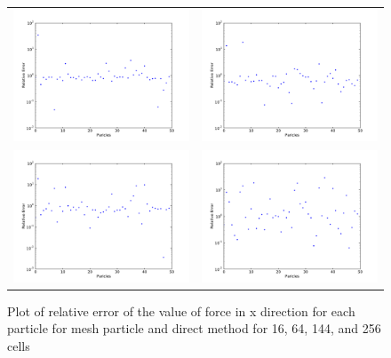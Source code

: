 \documentclass[10pt]{article}
\begin{document}
\begin{figure}[htp]
  \centering
  \caption{\label{fig:CompareForceErr}Plot of relative error of the value of force in x direction for each particle for mesh particle and direct method for 16, 64, 144, and 256 cells}
  \begin{tabular}{cc}
    \includegraphics[width=75mm]{Plots/MPCompare/Compare_4_error.pdf}&
    \includegraphics[width=75mm]{Plots/MPCompare/Compare_8_error.pdf}\\
    \includegraphics[width=75mm]{Plots/MPCompare/Compare_12_error.pdf}&
    \includegraphics[width=75mm]{Plots/MPCompare/Compare_16_error.pdf}\\
  \end{tabular}
\end{figure}
\end{document}
